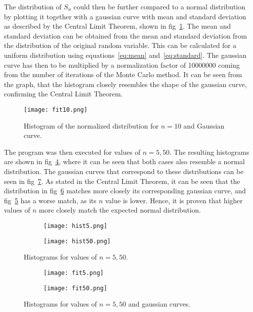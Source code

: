 \documentclass[12pt]{article}
\begin{document}
The distribution of $S_{n}$ could then be further compared to a normal distribution by plotting it together with a gaussian curve with mean and standard deviation as described by the Central Limit Theorem, shown in fig~\ref{ref:fit10}. The mean and standard deviation can be obtained from the mean and standard deviation from the distribution of the original random variable. This can be calculated for a uniform distribution using equations~\ref{eq:mean} and~\ref{eq:standard}. The gaussian curve has then to be multiplied by a normalization factor of 10000000 coming from the number of iterations of the Monte Carlo method. It can be seen from the graph, that the histogram closely resembles the shape of the gaussian curve, confirming the Central Limit Theorem.

\begin{figure}[H]
	\centering
	\texttt{[image: fit10.png]}
	\caption{Histogram of the normalized distribution for $n = 10$ and Gaussian curve.}
	\label{ref:fit10}
\end{figure}

The program was then executed for values of $n = 5, 50$. The resulting histograms are shown in fig~\ref{fig:histograms}, where it can be seen that both cases also resemble a normal distribution. The gaussian curves that correspond to these distributions can be seen in fig~\ref{fig:fits}. As stated in the Central Limit Theorem, it can be seen that the distribution in fig~\ref{fig:fit50} matches more closely its corresponding gaussian curve, and fig~\ref{fig:fit5} has a worse match, as its $n$ value is lower. Hence, it is proven that higher values of $n$ more closely match the expected normal distribution.

\begin{figure}[htp]
	\centering
	\begin{subfigure}[b]{0.9\textwidth}
		\centering
		\texttt{[image: hist5.png]}
		\caption{}
		\label{fig:histo5}
	\end{subfigure}
	\hfill
	\begin{subfigure}[b]{0.9\textwidth}
		\centering
		\texttt{[image: hist50.png]}
		\caption{}
		\label{fig:histo50}
	\end{subfigure}
	\caption{Histograms for values of $n = 5, 50$.}
	\label{fig:histograms}
\end{figure}

\begin{figure}[htp]
	\centering
	\begin{subfigure}[b]{0.8\textwidth}
		\centering
		\texttt{[image: fit5.png]}
		\caption{}
		\label{fig:fit5}
	\end{subfigure}
	\hfill
	\begin{subfigure}[b]{0.8\textwidth}
		\centering
		\texttt{[image: fit50.png]}
		\caption{}
		\label{fig:fit50}
	\end{subfigure}
	\caption{Histograms for values of $n = 5, 50$ and gaussian curves.}
	\label{fig:fits}
\end{figure}
\end{document}
